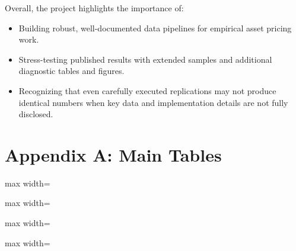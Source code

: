 \documentclass[11pt]{article}
\begin{document}
Overall, the project highlights the importance of:
\begin{itemize}
  \item Building robust, well-documented data pipelines for empirical asset
        pricing work.
  \item Stress-testing published results with extended samples and additional
        diagnostic tables and figures.
  \item Recognizing that even carefully executed replications may not produce
        identical numbers when key data and implementation details are not
        fully disclosed.
\end{itemize}


\clearpage
\appendix
\section*{Appendix A: Main Tables}

\begin{adjustbox}{max width=\textwidth}

\end{adjustbox}

\clearpage

\begin{adjustbox}{max width=\textwidth}

\end{adjustbox}

\clearpage

\begin{adjustbox}{max width=\textwidth}

\end{adjustbox}

\clearpage

\begin{adjustbox}{max width=\textwidth}

\end{adjustbox}
\end{document}
